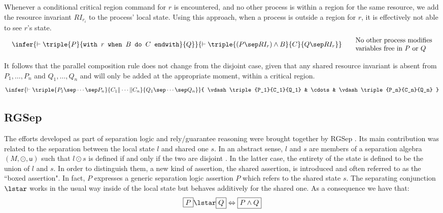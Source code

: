 Whenever a conditional critical region command for $r$ is encountered, and no other process is within a region for the same resource, we add the resource invariant $RI_{r_i}$ to the process' local state. Using this approach, when a process is outside a region for $r$, it is effectively not able to see $r$'s state.
\[
	\begin{array}{c c}
		\begin{array}{c}
		\infer
		{
			\vdash \triple
			{P}
			{\texttt{with } r \texttt{ when } B \texttt{ do } C \texttt{ endwith}}
			{Q}
		}
		{
			\vdash \triple
			{(P \sep RI_r) \land B}
			{C}
			{Q \sep RI_r}
		}
		\end{array}
		&
		\begin{array}{l}
			\text{No other process modifies} \\
			\text{variables free in $P$ or $Q$}
		\end{array}
	\end{array}
\]

It follows that the parallel composition rule does not change from the disjoint case, given that any shared resource invariant is absent from $P_1, \ldots, P_n$ and $Q_1, \ldots, Q_n$ and will only be added at the appropriate moment, within a critical region.
\[
	\infer
	{
		\vdash \triple
		{P_1 \sep \cdots \sep P_n}
		{C_1 \| \cdots \| C_n}
		{Q_1 \sep \cdots \sep Q_n}
	}
	{
		\vdash \triple
		{P_1}{C_1}{Q_1} &
		\cdots &
		\vdash \triple
		{P_n}{C_n}{Q_n}
	}
\]


\tocless\subsection{RGSep} \label{rgsep}

The efforts developed as part of separation logic and rely/guarantee reasoning were brought together by RGSep \cite{viktor}. Its main contribution was related to the separation between the local state $l$ and shared one $s$. In an abstract sense, $l$ and $s$ are members of a separation algebra $(M, \odot, \mathsf{u})$ such that $l \odot s$ is defined if and only if the two are disjoint \cite{sepalgebra}. In the latter case, the entirety of the state is defined to be the union of $l$ and $s$. In order to distinguish them, a new kind of assertion, the shared assertion, is introduced and often referred to as the ``boxed assertion". In fact, $\boxed{P}$ expresses a generic separation logic assertion $P$ which refers to the shared state $s$. The separating conjunction $\lstar$ works in the usual way inside of the local state but behaves additively for the shared one. As a consequence we have that:
\[
	\boxed{P} \lstar \boxed{Q} \Leftrightarrow \boxed{P \land Q}
\]

